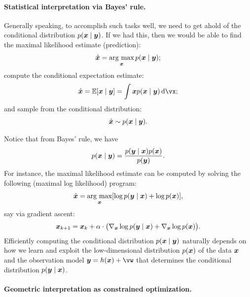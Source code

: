 \documentclass[../../book-main.tex]{subfiles}
\begin{document}
\paragraph{Statistical interpretation via Bayes' rule.} Generally speaking, to accomplish such tasks well, we need to get ahold of the conditional distribution $p(\bm{x}\mid \bm{y})$. If we had this, then we would be able to find the maximal likelihood estimate (prediction): 
\begin{equation}
  \hat{\bm{x}} = \operatorname*{arg\ max}_{\bm{x}} p(\bm{x}\mid \bm{y});
\end{equation}
compute the conditional expectation estimate: 
\begin{equation}
  \hat{\x} = \mathbb{E}[\x \mid \y] = \int \x p(\x\mid \y)\odif{\vx};
\end{equation}
and sample from the conditional distribution:  
\begin{equation}
  \hat{\bm{x}} \sim p(\bm{x} \mid \bm{y}).
\end{equation}

Notice that from Bayes' rule, we have
\begin{equation}
  p(\bm{x}\mid \bm{y}) = \frac{p(\bm{y}\mid \bm{x}) p(\bm{x}) }{p(\bm{y})}.
\end{equation} 
For instance, the maximal likelihood estimate can be computed by solving the following (maximal log likelihood) program:
\begin{equation}
    \hat{\bm{x}} = \operatorname*{arg\ max}_{\bm{x}} [\log p(\bm{y}\mid \bm{x}) + \log p(\bm{x})], 
\end{equation}
say via gradient ascent:
\begin{equation}
    \bm{x}_{k+1} = \bm{x}_k + \alpha \cdot \big(\nabla_{\bm{x}} \log p(\bm{y} \mid \bm{x}) + \nabla_{\bm{x}} \log p(\bm{x})\big).
    \label{eqn:loglikelihoo-gradient-ascent}
\end{equation}
Efficiently computing the conditional distribution $p(\bm{x} \mid \bm{y})$ naturally depends on how we learn and exploit the low-dimensional distribution $p(\bm{x})$ of the data $\bm{x}$ and the observation model $\y = h(\x) + \vw$ that determines the conditional distribution $p(\bm{y} \mid \bm{x})$. 

\paragraph{Geometric interpretation as constrained optimization.}
\end{document}
